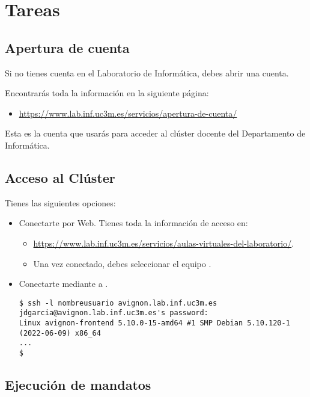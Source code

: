 \section{Tareas}

\subsection{Apertura de cuenta}

Si no tienes cuenta en el Laboratorio de Informática, debes abrir una cuenta.

Encontrarás toda la información en la siguiente página:

\begin{itemize}
  \item \url{https://www.lab.inf.uc3m.es/servicios/apertura-de-cuenta/}
\end{itemize}

Esta es la cuenta que usarás para acceder al clúster docente del Departamento de Informática.

\subsection{Acceso al Clúster}

Tienes las siguientes opciones:


\begin{itemize}
  \item Conectarte por Web. Tienes toda la información de acceso en:
    \begin{itemize}
      \item \url{https://www.lab.inf.uc3m.es/servicios/aulas-virtuales-del-laboratorio/}.
      \item Una vez conectado, debes seleccionar el equipo .
    \end{itemize}

  \item Conectarte mediante  a .
\begin{lstlisting}[style=terminal]
$ ssh -l nombreusuario avignon.lab.inf.uc3m.es
jdgarcia@avignon.lab.inf.uc3m.es's password: 
Linux avignon-frontend 5.10.0-15-amd64 #1 SMP Debian 5.10.120-1 (2022-06-09) x86_64
...
$
\end{lstlisting}

\end{itemize}

\subsection{Ejecución de mandatos}


